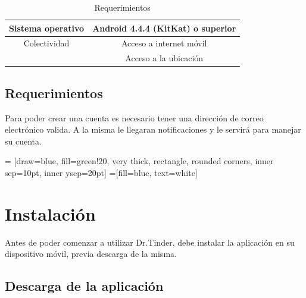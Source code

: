 \documentclass[10pt,letterpaper,extrafontsizes]{memoir}
\begin{document}
\begin{table}[H]
\centering
\begin{tabular}{|c|c|}
\hline
Sistema operativo&Android 4.4.4 (KitKat) o superior\\ \hline
Colectividad&Acceso a internet móvil\\ \hline
&Acceso a la ubicación\\
\hline
\end{tabular}
\caption{Requerimientos}
\label{table:reqs}
\end{table}

\section{Requerimientos}

Para poder crear una cuenta es necesario tener una dirección de correo electrónico valida. A la misma le llegaran notificaciones y le servirá para manejar su cuenta.

\begin{center}
 = [draw=blue, fill=green!20, very thick,
    rectangle, rounded corners, inner sep=10pt, inner ysep=20pt]
 =[fill=blue, text=white]
\end{center}
%


\chapter{Instalación} \label{chap:primerUso}

Antes de poder comenzar a utilizar Dr.Tinder, debe instalar la aplicación en su dispositivo móvil, previa descarga de la misma.

\newpage
\section{Descarga de la aplicación}
\end{document}
